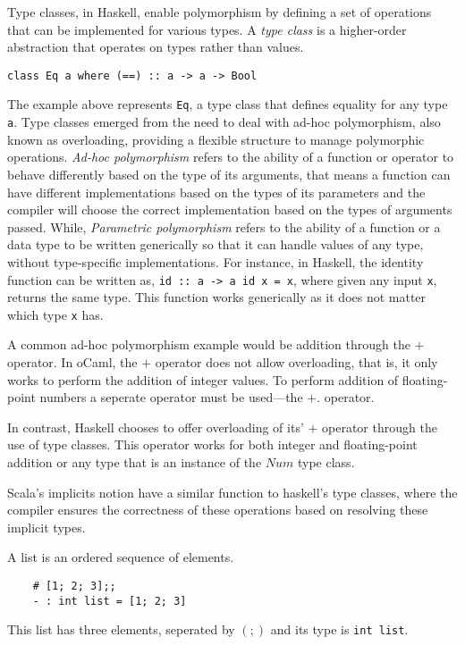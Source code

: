 Type classes, in Haskell, enable polymorphism by defining a set of operations that can be implemented for various types. A \textit{type class} is a higher-order abstraction that operates on types rather than values.

\lstinline{class Eq a where (==) :: a -> a -> Bool}

The example above represents \lstinline{Eq}, a type class that defines equality for any type \lstinline{a}. Type classes emerged from the need to deal with ad-hoc polymorphism, also known as overloading, providing a flexible structure to manage polymorphic operations. 
\textit{Ad-hoc polymorphism} refers to the ability of a function or operator to behave differently based on the type of its arguments, that means a function can have different implementations based on the types of its parameters and the compiler will choose the correct implementation based on the types of arguments passed.
While, \textit{Parametric polymorphism} refers to the ability of a function or a data type to be written generically so that it can handle values of any type, without type-specific implementations. For instance, in Haskell, the identity function can be written as, \lstinline{id :: a -> a id x = x}, where given any input \lstinline{x}, returns the same type. This function works generically as it does not matter which type \lstinline{x} has.


A common ad-hoc polymorphism example would be addition through the $+$ operator. In oCaml, the $+$ operator does not allow overloading, that is, it only works to perform the addition of integer values. To perform addition of floating-point numbers a seperate operator must be used---the $+.$ operator.

In contrast, Haskell chooses to offer overloading of its' $+$ operator through the use of type classes. This operator works for both integer and floating-point addition or any type that is an instance of the $Num$ type class.

Scala’s implicits notion have a similar function to haskell's type classes, where the compiler ensures the correctness of these operations based on resolving these implicit types. %

A list is an ordered sequence of elements. 
\begin{lstlisting}
    # [1; 2; 3];;
    - : int list = [1; 2; 3]
\end{lstlisting}
This list has three elements, seperated by $(;)$ and its type is \lstinline{int list}.

